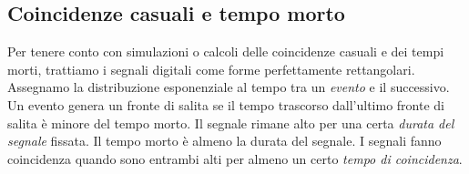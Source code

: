 \subsection{Coincidenze casuali e tempo morto}

Per tenere conto con simulazioni o calcoli delle coincidenze casuali e dei tempi morti,
trattiamo i segnali digitali come forme perfettamente rettangolari.
Assegnamo la distribuzione esponenziale al tempo tra un \emph{evento} e il successivo.
Un evento genera un fronte di salita se il tempo trascorso dall'ultimo fronte di salita
è minore del tempo morto.
Il segnale rimane alto per una certa \emph{durata del segnale} fissata.
Il tempo morto è almeno la durata del segnale.
I segnali fanno coincidenza quando sono entrambi alti per almeno un certo \emph{tempo di coincidenza}.
